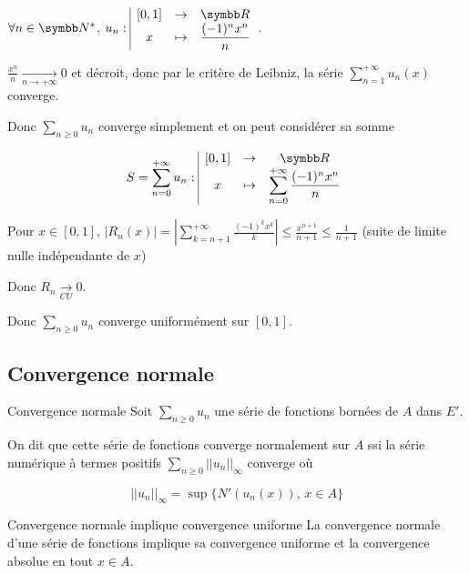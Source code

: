 \begin{exemple}
    $\forall n \in \N^*$, $\fonction{u_n}{[0, 1]}{\R}{x}{\frac{(-1)^n x^n}{n}}$.

    
    \avspace $\displaystyle \frac{x^n }{n } \xrightarrow[n\to +\infty]{} 0$ et décroit, 
    donc par le critère de Leibniz, la série $\displaystyle \sum_{n = 1}^{ + \infty } u_n(x)$ converge.

    Donc $\displaystyle \sum_{n \geqslant 0} u_n$ converge simplement et on peut considérer sa somme 

    $$S = \sum_{n = 0}^{ + \infty } u_n \fonction{}{[0, 1]}{\R}{x}{\sum_{n = 0}^{ + \infty } \frac{(-1)^n x^n}{n}}$$


    \avspace Pour $x \in [0, 1], \, \displaystyle |R_n(x)| = \left| \sum_{k = n + 1}^{ + \infty } \frac{(-1)^k x^k}{k} \right| \leqslant \frac{x^{n + 1}}{n + 1} \leqslant \frac 1 {n + 1}$ 
    (suite de limite nulle indépendante de $x$)

    Donc $\displaystyle R_n \xrightarrow[CU]{} 0$.

    Donc $\displaystyle \sum_{n \geqslant 0} u_n$ converge uniformément sur $[0, 1]$.
\end{exemple}


\subsection{Convergence normale}

\begin{definition}{Convergence normale}{}
    Soit $\displaystyle \sum_{n \geqslant 0} u_n$ une série de fonctions bornées de $A$ dans $E'$.

    On dit que cette série de fonctions converge normalement sur $A$ ssi la série numérique 
    à termes positifs $\displaystyle \sum_{n \geqslant 0} || u_n ||_{\infty}$ converge où 

    $$||u_n||_{\infty} = \sup\{ N'(u_n(x)), \, x \in A \}$$
\end{definition}

\begin{theoreme}{Convergence normale implique convergence uniforme}{}
    La convergence normale d'une série de fonctions implique sa convergence uniforme et la convergence 
    absolue en tout $x \in A$. 
\end{theoreme}

